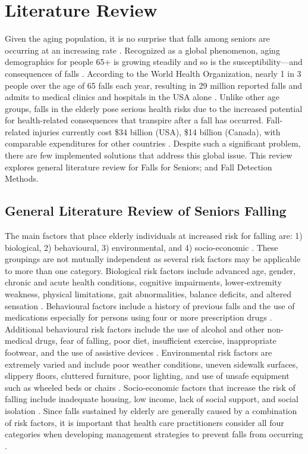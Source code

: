 \chapter{Literature Review}
Given the aging population, it is no surprise that falls among seniors are occurring at an increasing rate \cite{world2018, RN1014, JP2019}. Recognized as a global phenomenon, aging demographics for people 65+ is growing steadily and so is the susceptibility—and consequences of falls \cite{world2018, RN1014, JP2019}.  According to the World Health Organization, nearly 1 in 3 people over the age of 65 falls each year, resulting in 29 million reported falls and admits to medical clinics and hospitals in the USA alone \cite{world2018}. Unlike other age groups, falls in the elderly pose serious health risks due to the increased potential for health-related consequences that transpire after a fall has occurred. Fall-related injuries currently cost \$34 billion (USA), \$14 billion (Canada), with comparable expenditures for other countries \cite{RN1014}.  Despite such a significant problem, there are few implemented solutions that address this global issue.  This review explores general literature review for Falls for Seniors; and Fall Detection Methods.

\section{General Literature Review of Seniors Falling}

The main factors that place elderly individuals at increased risk for falling are: 1) biological, 2) behavioural, 3) environmental, and 4) socio-economic \cite{RN1000}. These groupings are not mutually independent as several risk factors may be applicable to more than one category. Biological risk factors include advanced age, gender, chronic and acute health conditions, cognitive impairments, lower-extremity weakness, physical limitations, gait abnormalities, balance deficits, and altered sensation \cite{RN1000}. Behavioural factors include a history of previous falls and the use of medications especially for persons using four or more prescription drugs \cite{RN1000}. Additional behavioural risk factors include the use of alcohol and other non-medical drugs, fear of falling, poor diet, insufficient exercise, inappropriate footwear, and the use of assistive devices \cite{RN1011}. Environmental risk factors are extremely varied and include poor weather conditions, uneven sidewalk surfaces, slippery floors, cluttered furniture, poor lighting, and use of unsafe equipment such as wheeled beds or chairs \cite{Rub2006}. Socio-economic factors that increase the risk of falling include inadequate housing, low income, lack of social support, and social isolation \cite{RN1001}. Since falls sustained by elderly are generally caused by a combination of risk factors, it is important that health care practitioners consider all four categories when developing management strategies to prevent falls from occurring \cite{RN1000, RN1011, Rub2006}.



